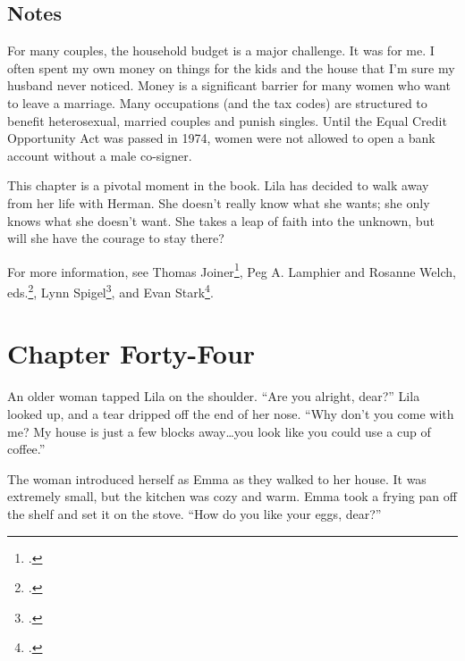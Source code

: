 \documentclass[
  letterpaper,
]{book}
\begin{document}
\section{Notes}\label{notes-45}

For many couples, the household budget is a major challenge. It was for
me. I often spent my own money on things for the kids and the house that
I'm sure my husband never noticed. Money is a significant barrier for
many women who want to leave a marriage. Many occupations (and the tax
codes) are structured to benefit heterosexual, married couples and
punish singles. Until the Equal Credit Opportunity Act was passed in
1974, women were not allowed to open a bank account without a male
co-signer.

This chapter is a pivotal moment in the book. Lila has decided to walk
away from her life with Herman. She doesn't really know what she wants;
she only knows what she doesn't want. She takes a leap of faith into the
unknown, but will she have the courage to stay there?

For more information, see Thomas Joiner\footnote{.},
Peg A. Lamphier and Rosanne Welch, eds.\footnote{.}, Lynn
Spigel\footnote{.}, and Evan Stark\footnote{.}.


\chapter{Chapter Forty-Four}\label{chapter-forty-four}

An older woman tapped Lila on the shoulder. ``Are you alright, dear?''
Lila looked up, and a tear dripped off the end of her nose. ``Why don't
you come with me? My house is just a few blocks away\ldots you look like
you could use a cup of coffee.''

The woman introduced herself as Emma as they walked to her house. It was
extremely small, but the kitchen was cozy and warm. Emma took a frying
pan off the shelf and set it on the stove. ``How do you like your eggs,
dear?''
\end{document}

